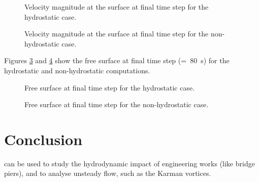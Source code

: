 \begin{figure}[H]
  \centering
  \caption{Velocity magnitude at the surface at final time step for the hydrostatic case.}
  \label{t3d:pildepon:VeloHydro}
\end{figure}

\begin{figure}[H]
  \centering
  \caption{Velocity magnitude at the surface at final time step for the non-hydrostatic case.}
  \label{t3d:pildepon:VeloNH}
\end{figure}

Figures \ref{t3d:pildepon:FreeSurfHydro} and \ref{t3d:pildepon:FreeSurfNH} show
the free surface at final time step (=~80~s) for the hydrostatic and non-hydrostatic
computations.

\begin{figure}[H]
  \centering
  \caption{Free surface at final time step for the hydrostatic case.}
  \label{t3d:pildepon:FreeSurfHydro}
\end{figure}

\begin{figure}[H]
  \centering
  \caption{Free surface at final time step for the non-hydrostatic case.}
  \label{t3d:pildepon:FreeSurfNH}
\end{figure}

\section{Conclusion}

 can be used to study the hydrodynamic impact of engineering
works (like bridge piers), and to analyse unsteady flow, such as the
Karman vortices.
